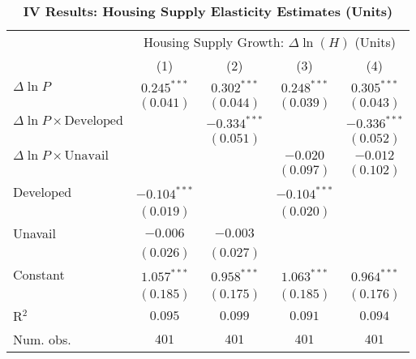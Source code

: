 
\begin{table}[H]
\caption{\textbf{IV Results: Housing Supply Elasticity Estimates (Units)}}
\begin{center}
\begin{normalsize}
\begin{threeparttable}
\begin{tabular}{l@{} c@{} c@{} c@{} c@{}}
\toprule
 & \multicolumn{4}{c}{Housing Supply Growth: $\Delta\ln(H)$ (Units)} \\
\cmidrule(lr){2-5}
 & (1) & (2) & (3) & (4) \\
\midrule
$\Delta\ln P$                         & $0.245^{***}$  & $0.302^{***}$  & $0.248^{***}$  & $0.305^{***}$  \\
                                      & $(0.041)$      & $(0.044)$      & $(0.039)$      & $(0.043)$      \\
$\Delta\ln P\times{\text{Developed}}$ &                & $-0.334^{***}$ &                & $-0.336^{***}$ \\
                                      &                & $(0.051)$      &                & $(0.052)$      \\
$\Delta\ln P\times{\text{Unavail}}$   &                &                & $-0.020$       & $-0.012$       \\
                                      &                &                & $(0.097)$      & $(0.102)$      \\
Developed                             & $-0.104^{***}$ &                & $-0.104^{***}$ &                \\
                                      & $(0.019)$      &                & $(0.020)$      &                \\
Unavail                               & $-0.006$       & $-0.003$       &                &                \\
                                      & $(0.026)$      & $(0.027)$      &                &                \\
Constant                              & $1.057^{***}$  & $0.958^{***}$  & $1.063^{***}$  & $0.964^{***}$  \\
                                      & $(0.185)$      & $(0.175)$      & $(0.185)$      & $(0.176)$      \\
\midrule
R$^2$                                 & $0.095$        & $0.099$        & $0.091$        & $0.094$        \\
Num. obs.                             & $401$          & $401$          & $401$          & $401$          \\

\end{tabular}
\end{threeparttable}
\end{normalsize}
\end{center}
\end{table}
